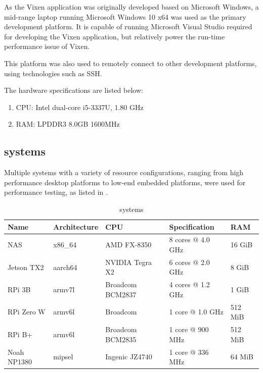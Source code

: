 As the Vixen application was originally developed based on Microsoft Windows,  a mid-range laptop running Microsoft Windows 10 x64 was used as the primary development platform. It is capable of running Microsoft Visual Studio  required for developing the Vixen application, but  relatively  power the run-time performance issue of Vixen.

This platform was also used to remotely connect to other development platforms, using technologies such as SSH.

The hardware specifications are listed below:

\begin{enumerate}[noitemsep,label={}]
  \item CPU: Intel dual-core i5-3337U, 1.80 GHz
  \item RAM: LPDDR3 8.0GB 1600MHz
\end{enumerate}

\subsection{ systems}
\label{sec:systems}

Multiple  systems with a variety of resource configurations, ranging from high performance desktop platforms to low-end embedded platforms, were used for performance testing, as listed in .

\begin{table}[t]
  \centering
  \begin{tabular}{l|l|l|l|l}
    \hline
    \textbf{Name} & \textbf{Architecture} & \textbf{CPU} & \textbf{Specification} & \textbf{RAM} \\
    \hline
    NAS         & x86\_64 & AMD FX-8350       & 8 cores @ 4.0 GHz  & 16 GiB   \\ \hline
    Jetson TX2  & aarch64 & NVIDIA Tegra X2   & 6 cores @ 2.0 GHz  & 8 GiB    \\ \hline
    RPi 3B      & armv7l  & Broadcom BCM2837  & 4 cores @ 1.2 GHz  & 1 GiB    \\ \hline
    RPi Zero W  & armv6l  & Broadcom          & 1 core @ 1.0 GHz   & 512 MiB  \\ \hline
    RPi B+      & armv6l  & Broadcom BCM2835  & 1 core @ 900 MHz   & 512 MiB  \\ \hline
    Noah NP1380 & mipsel  & Ingenic JZ4740    & 1 core @ 336 MHz   & 64 MiB   \\ \hline
  \end{tabular}
  \caption{\footnotesize {} systems}
  \label{tbl:linux}
\end{table}

